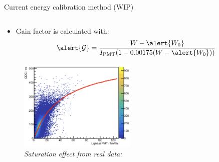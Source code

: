 \documentclass{ikpKoeln}
\begin{document}
\begin{frame}[t]{Current energy calibration method (WIP)}
\begin{columns}[t]
\begin{column}{0.45 \textwidth}
{\begin{itemize}
					      \vspace{-0.5em}
					      $$ \alert{\alpha} = \ln(I^r_\text{PMT}/I^l_\text{PMT}) / (2 \cdot x)$$
					\item \vspace{-1em}Gain factor is calculated with:
					      \vspace{-0.5em}
					      $$\alert{\mathcal{G}} = \frac{W - \alert{W_0}}{I_\text{PMT} (1 - 0.00175(W - \alert{W_0}))}$$
				\end{itemize}
			}
			\begin{figure}
				\captionsetup{singlelinecheck=off,font=footnotesize}
				\vspace{-2em}
				\caption*{\textit{Saturation effect from real data:}}
				\includegraphics[width = 0.5\textwidth]{neuland/RealPMTSat}
			\end{figure}
		\end{column}
	\end{columns}
\end{frame}
\end{document}
